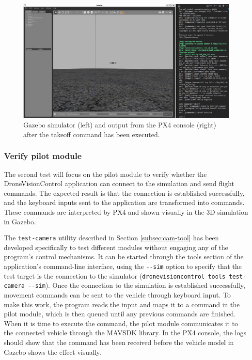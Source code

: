 \begin{figure}
  \centering
  \includegraphics[width=\textwidth, keepaspectratio]{img/gazebo-takeoff.png}
  \caption{Gazebo simulator (left) and output from the PX4 console (right) after the takeoff command has been executed.}
  \label{fig:gazebo-takeoff}
\end{figure}


\subsubsection{Verify pilot module}

The second test will focus on the pilot module to verify whether the DroneVisionControl application can connect to the simulation and send flight commands. The expected result is that the connection is established successfully, and the keyboard inputs sent to the application are transformed into commands. These commands are interpreted by PX4 and shown visually in the 3D simulation in Gazebo.

The \texttt{test-camera} utility described in Section \ref{subsec:cam-tool} has been developed specifically to test different modules without engaging any of the program's control mechanisms. It can be started through the tools section of the application's command-line interface, using the \texttt{-{}-sim} option to specify that the test target is the connection to the simulator (\texttt{dronevisioncontrol tools test-camera -{}-sim}).
Once the connection to the simulation is established successfully, movement commands can be sent to the vehicle through keyboard input. To make this work, the program reads the input and maps it to a command in the pilot module, which is then queued until any previous commands are finished. When it is time to execute the command, the pilot module communicates it to the connected vehicle through the MAVSDK library. In the PX4 console, the logs should show that the command has been received before the vehicle model in Gazebo shows the effect visually.

